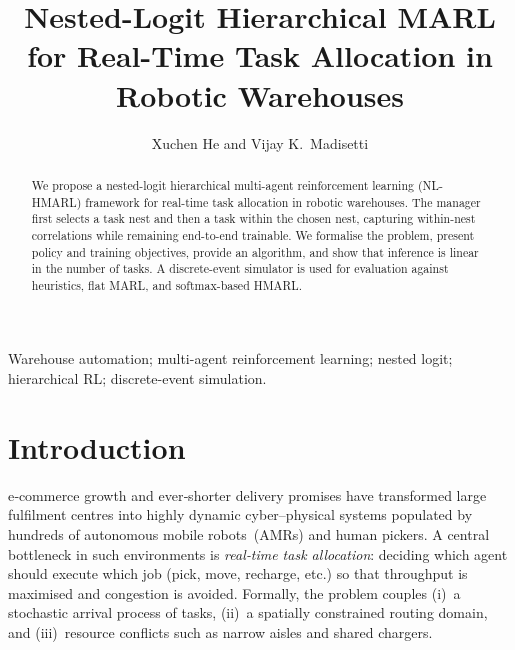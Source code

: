 \documentclass[journal,onecolumn]{IEEEtran}
\begin{document}
\title{Nested-Logit Hierarchical MARL for Real-Time Task Allocation in Robotic Warehouses}
\author{Xuchen He and Vijay K.~Madisetti}
\maketitle

\begin{abstract}
We propose a nested-logit hierarchical multi-agent reinforcement learning (NL-HMARL) framework for real-time task allocation in robotic warehouses. The manager first selects a task nest and then a task within the chosen nest, capturing within-nest correlations while remaining end-to-end trainable. We formalise the problem, present policy and training objectives, provide an algorithm, and show that inference is linear in the number of tasks. A discrete-event simulator is used for evaluation against heuristics, flat MARL, and softmax-based HMARL.
\end{abstract}

\begin{IEEEkeywords}
Warehouse automation; multi-agent reinforcement learning; nested logit; hierarchical RL; discrete-event simulation.
\end{IEEEkeywords}

\onecolumn

\section{Introduction}
 e‑commerce growth and ever‑shorter delivery promises have transformed large fulfilment centres into highly dynamic cyber–physical systems populated by hundreds of autonomous mobile robots (AMRs) and human pickers.%
A central bottleneck in such environments is \emph{real‑time task allocation}: deciding which agent should execute which job (pick, move, recharge, etc.) so that throughput is maximised and congestion is avoided.%
Formally, the problem couples (i) a stochastic arrival process of tasks, (ii) a spatially constrained routing domain, and (iii) resource conflicts such as narrow aisles and shared chargers.
\end{document}
